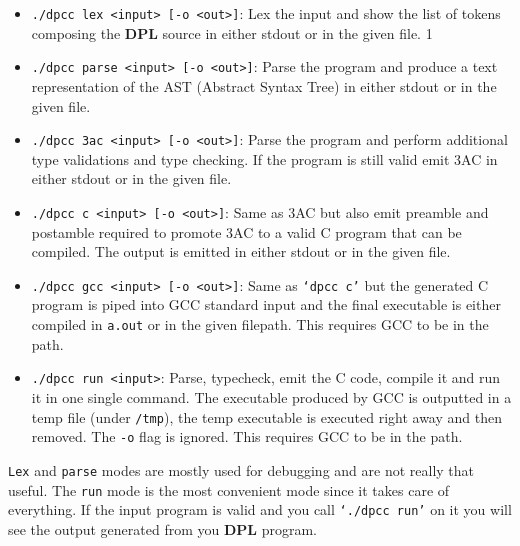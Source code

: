 \documentclass[a4paper]{article}
\begin{document}
\begin{itemize}
    \item \texttt{./dpcc lex <input> [-o <out>]}: Lex the input and show the list of tokens composing the \textbf{DPL} source in either stdout or in the given file.
 1   \item \texttt{./dpcc parse <input> [-o <out>]}: Parse the program and produce a text representation of the AST (Abstract Syntax Tree) in either stdout or in the given file.
    \item \texttt{./dpcc 3ac <input> [-o <out>]}: Parse the program and perform additional type validations and type checking. If the program is still valid emit 3AC in either stdout or in the given file.
    \item \texttt{./dpcc c <input> [-o <out>]}: Same as 3AC but also emit preamble and postamble required  to promote 3AC to a  valid C program that can be compiled. The output is emitted in either stdout or in the given file.
    \item \texttt{./dpcc gcc <input> [-o <out>]}: Same as \texttt{`dpcc c'} but the generated C program is piped into GCC standard input and the final executable is either compiled in \texttt{a.out} or in the given filepath. This requires GCC to be in the path.
    \item \texttt{./dpcc run <input>}: Parse, typecheck, emit the C code, compile it and run it in one single command. The executable produced by GCC is outputted in a temp file (under \texttt{/tmp}), the temp executable is executed right away and then removed. The \texttt{-o} flag is ignored. This requires GCC to be in the path.
\end{itemize}

\texttt{Lex} and \texttt{parse} modes are mostly used for debugging and are not really that useful.
The \texttt{run} mode
is the most convenient mode since it takes care of everything. If the input program is valid and
you call \texttt{`./dpcc run'} on it you will see the output generated from you \textbf{DPL} program.

\clearpage
\end{document}
